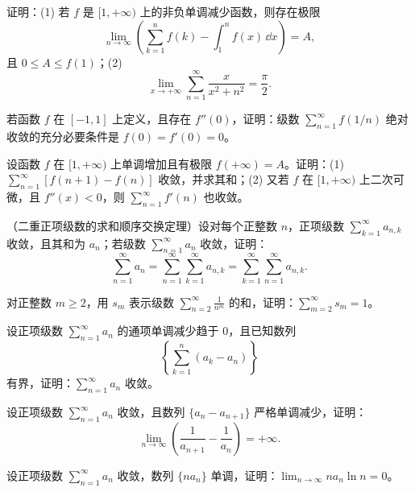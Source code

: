 \begin{xreferenceproblem}[6]
证明：(1) 若 $f$ 是 $[1,+\infty)$ 上的非负单调减少函数，则存在极限
\[
\lim_{n\to\infty}\left(\sum_{k=1}^{n}f(k)-\int_1^n f(x)\,\dd x\right)=A,
\]
且 $0\leq A\leq f(1)$；(2)
\[
\lim_{x\to+\infty}\sum_{n=1}^{\infty}\frac{x}{x^2+n^2}=\frac\pi2.
\]
\end{xreferenceproblem}

\begin{xreferenceproblem}[7]
若函数 $f$ 在 $[-1,1]$ 上定义，且存在 $f''(0)$，证明：级数 $\sum_{n=1}^{\infty}f(1/n)$ 绝对收敛的充分必要条件是 $f(0)=f'(0)=0$。
\end{xreferenceproblem}

\begin{xreferenceproblem}[8]
设函数 $f$ 在 $[1,+\infty)$ 上单调增加且有极限 $f(+\infty)=A$。证明：(1) $\sum_{n=1}^{\infty}[f(n+1)-f(n)]$ 收敛，并求其和；(2) 又若 $f$ 在 $[1,+\infty)$ 上二次可微，且 $f''(x)<0$，则 $\sum_{n=1}^{\infty}f'(n)$ 也收敛。
\end{xreferenceproblem}

\begin{xreferenceproblem}[9]
（二重正项级数的求和顺序交换定理）设对每个正整数 $n$，正项级数 $\sum_{k=1}^{\infty}a_{n,k}$ 收敛，且其和为 $a_n$；若级数 $\sum_{n=1}^{\infty}a_n$ 收敛，证明：
\[
\sum_{n=1}^{\infty}a_n=\sum_{n=1}^{\infty}\sum_{k=1}^{\infty}a_{n,k}=\sum_{k=1}^{\infty}\sum_{n=1}^{\infty}a_{n,k}.
\]
\end{xreferenceproblem}

\begin{xreferenceproblem}[10]
对正整数 $m\geq2$，用 $s_m$ 表示级数 $\sum_{n=2}^{\infty}\frac1{n^m}$ 的和，证明：$\sum_{m=2}^{\infty}s_m=1$。
\end{xreferenceproblem}

\begin{xreferenceproblem}[11]
设正项级数 $\sum_{n=1}^{\infty}a_n$ 的通项单调减少趋于 0，且已知数列
\[
\left\{\sum_{k=1}^{n}(a_k-a_n)\right\}
\]
有界，证明：$\sum_{n=1}^{\infty}a_n$ 收敛。
\end{xreferenceproblem}

\begin{xreferenceproblem}[12]
设正项级数 $\sum_{n=1}^{\infty}a_n$ 收敛，且数列 $\{a_n-a_{n+1}\}$ 严格单调减少，证明：
\[
\lim_{n\to\infty}\left(\frac1{a_{n+1}}-\frac1{a_n}\right)=+\infty.
\]
\end{xreferenceproblem}

\begin{xreferenceproblem}[13]
设正项级数 $\sum_{n=1}^{\infty}a_n$ 收敛，数列 $\{na_n\}$ 单调，证明：$\lim_{n\to\infty}na_n\ln n=0$。
\end{xreferenceproblem}

